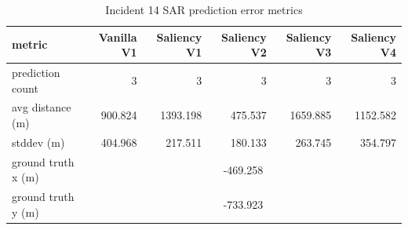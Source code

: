 \begin{table}[ht]
\centering
\caption{Incident 14 SAR prediction error metrics}
\label{tab:sar-incident-14}
\begin{tabular}{lrrrrr}
\hline
metric & Vanilla V1 & Saliency V1 & Saliency V2 & Saliency V3 & Saliency V4 \\
\hline
prediction count & 3 & 3 & 3 & 3 & 3 \\
avg distance (m) & 900.824 & 1393.198 & 475.537 & 1659.885 & 1152.582 \\
stddev (m) & 404.968 & 217.511 & 180.133 & 263.745 & 354.797 \\
ground truth x (m) & \multicolumn{5}{c}{-469.258} \\
ground truth y (m) & \multicolumn{5}{c}{-733.923} \\
\hline
\end{tabular}
\end{table}
